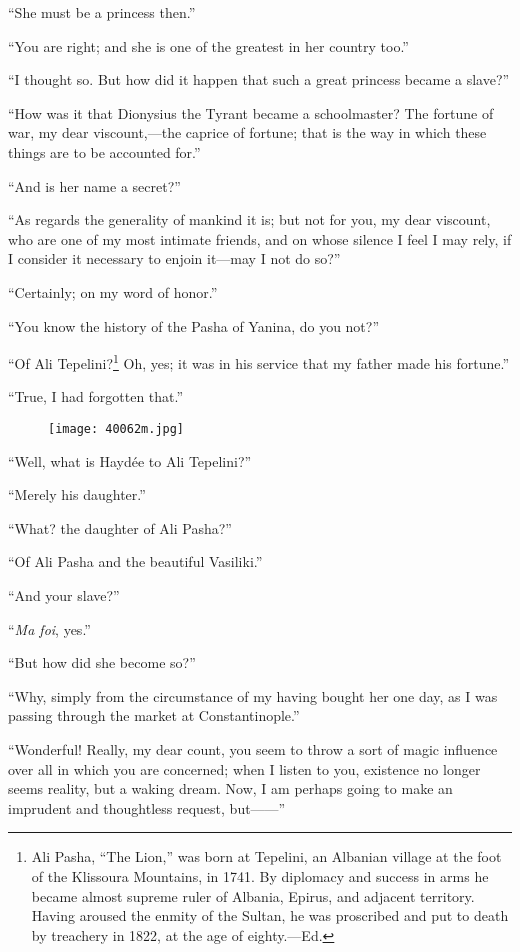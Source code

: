 “She must be a princess then.”

“You are right; and she is one of the greatest in her country too.”

“I thought so. But how did it happen that such a great princess became
a slave?”

“How was it that Dionysius the Tyrant became a schoolmaster? The
fortune of war, my dear viscount,—the caprice of fortune; that is the
way in which these things are to be accounted for.”

“And is her name a secret?”

“As regards the generality of mankind it is; but not for you, my dear
viscount, who are one of my most intimate friends, and on whose silence
I feel I may rely, if I consider it necessary to enjoin it—may I not do
so?”

“Certainly; on my word of honor.”

“You know the history of the Pasha of Yanina, do you not?”

“Of Ali Tepelini?\footnote[13]{Ali Pasha, “The Lion,” was born at Tepelini,
an Albanian village at the foot of the Klissoura Mountains, in 1741. By
diplomacy and success in arms he became almost supreme ruler of Albania,
Epirus, and adjacent territory. Having aroused the enmity of the Sultan,
he was proscribed and put to death by treachery in 1822, at the age of
eighty.—Ed.} Oh, yes; it was in his service that my father made his fortune.”

“True, I had forgotten that.”

\begin{figure}[ht]
\texttt{[image: 40062m.jpg]}
\end{figure}

“Well, what is Haydée to Ali Tepelini?”

“Merely his daughter.”

“What? the daughter of Ali Pasha?”

“Of Ali Pasha and the beautiful Vasiliki.”

“And your slave?”

“\textit{Ma foi}, yes.”

“But how did she become so?”

“Why, simply from the circumstance of my having bought her one day, as
I was passing through the market at Constantinople.”

“Wonderful! Really, my dear count, you seem to throw a sort of magic
influence over all in which you are concerned; when I listen to you,
existence no longer seems reality, but a waking dream. Now, I am
perhaps going to make an imprudent and thoughtless request, but——”

